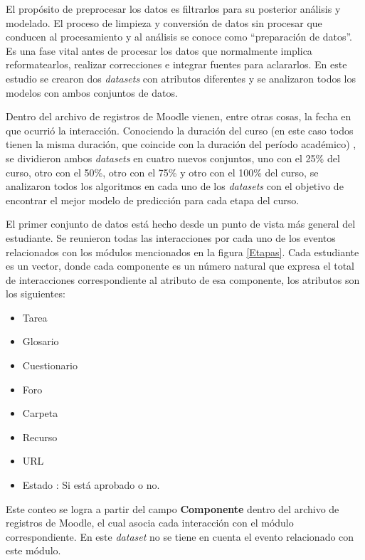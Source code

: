 El propósito de preprocesar los datos es filtrarlos para su posterior análisis y modelado. El proceso de limpieza y conversión de datos sin procesar que conducen al procesamiento y al análisis se conoce como ``preparación de datos''. Es una fase vital antes de procesar los datos que normalmente implica reformatearlos, realizar correcciones e integrar fuentes para aclararlos. En este estudio se crearon dos \textit{datasets} con atributos diferentes y se analizaron todos los modelos con ambos conjuntos de datos. 

Dentro del archivo de registros de Moodle vienen, entre otras cosas, la fecha en que ocurrió la interacción. Conociendo la duración del curso (en este caso todos tienen la misma duración, que coincide con la duración del período académico) , se dividieron ambos \textit{datasets} en cuatro nuevos conjuntos, uno con el 25\% del curso, otro con el 50\%, otro con el 75\% y otro con el 100\% del curso, se analizaron todos los algoritmos en cada uno de los \textit{datasets} con el objetivo de encontrar el mejor modelo de predicción para cada etapa del curso.

El primer conjunto de datos está hecho desde un punto de vista más general del estudiante. Se reunieron todas las interacciones por cada uno de los eventos relacionados con los módulos mencionados en la figura \ref{Etapas}. Cada estudiante es un vector, donde cada componente es un número natural que expresa el total de interacciones correspondiente al atributo de esa componente, los atributos son los siguientes: 

\begin{itemize}
    \item Tarea
    \item Glosario
    \item Cuestionario
    \item Foro
    \item Carpeta
    \item Recurso
    \item URL
    \item Estado : Si está aprobado o no.
\end{itemize}

Este conteo se logra a partir del campo \textbf{Componente} dentro del archivo de registros de Moodle, el cual asocia cada interacción con el módulo correspondiente. En este \textit{dataset} no se tiene en cuenta el evento relacionado con este módulo.  


